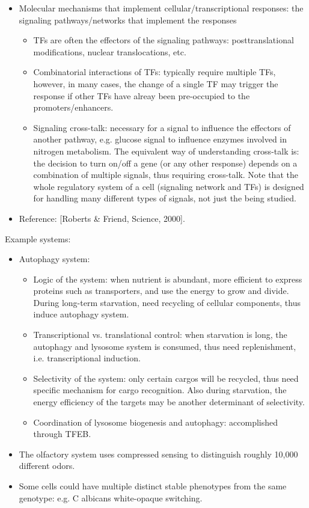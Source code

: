 \documentclass{report}
\begin{document}
\begin{itemize}
\item Molecular mechanisms that implement cellular/transcriptional responses: the signaling pathways/networks that implement the responses
\begin{itemize}
	\item TFs are often the effectors of the signaling pathways: posttranslational modifications, nuclear translocations, etc. 
	\item Combinatorial interactions of TFs: typically require multiple TFs, however, in many cases, the change of a single TF may trigger the response if other TFs have alreay been pre-occupied to the promoters/enhancers. 
	\item Signaling cross-talk: necessary for a signal to influence the effectors of another pathway, e.g. glucose signal to influence enzymes involved in nitrogen metabolism. The equivalent way of understanding cross-talk is: the decision to turn on/off a gene (or any other response) depends on a combination of multiple signals, thus requiring cross-talk. Note that the whole regulatory system of a cell (signaling network and TFs) is designed for handling many different types of signals, not just the being studied. 
\end{itemize}

\item Reference: [Roberts \& Friend, Science, 2000].
\end{itemize}

Example systems: 
\begin{itemize}
\item Autophagy system: 
\begin{itemize}
	\item Logic of the system: when nutrient is abundant, more efficient to express proteins such as transporters, and use the energy to grow and divide. During long-term starvation, need recycling of cellular components, thus induce autophagy system. 
	\item Transcriptional vs. translational control: when starvation is long, the autophagy and lysosome system is consumed, thus need replenishment, i.e. transcriptional induction.  
	\item Selectivity of the system: only certain cargos will be recycled, thus need specific mechanism for cargo recognition. Also during starvation, the energy efficiency of the targets may be another determinant of selectivity. 
	\item Coordination of lysosome biogenesis and autophagy: accomplished through TFEB. 
\end{itemize}

\item The olfactory system uses compressed sensing to distinguish roughly 10,000 different odors.

\item Some cells could have multiple distinct stable phenotypes from the same genotype: e.g. C albicans white-opaque switching. 
\end{itemize}
\end{document}
